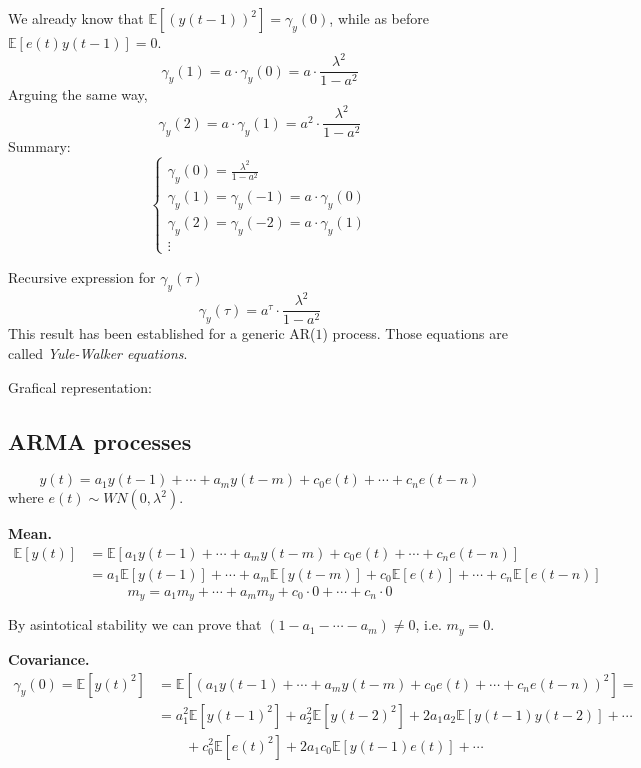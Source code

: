 We already know that $\mathbb{E}\left[(y(t-1))^{2}\right]=\gamma_{y}(0)$, while as before $\mathbb{E}[e(t) y(t-1)]=0$.
$$
\gamma_{y}(1)=a \cdot \gamma_{y}(0)=a \cdot \frac{\lambda^{2}}{1-a^{2}}
$$
Arguing the same way,
\[
	\gamma_{y}(2)=a \cdot \gamma_{y}(1)=a^{2} \cdot \frac{\lambda^{2}}{1-a^{2}}
\]
Summary:
\begin{equation*}
	\begin{cases}
		\gamma_{y}(0)=\frac{\lambda^{2}}{1-a^{2}} \\
		\gamma_{y}(1)=\gamma_{y}(-1)=a \cdot \gamma_{y}(0) \\
		\gamma_{y}(2)=\gamma_{y}(-2)=a \cdot \gamma_{y}(1) \\
		\vdots
	\end{cases}
\end{equation*}

Recursive expression for $\gamma_{y}(\tau)$
$$
	\gamma_{y}(\tau)=a^{\tau} \cdot \frac{\lambda^{2}}{1-a^{2}}
$$
This result has been established for a generic AR($1$) process.
Those equations are called \emph{Yule-Walker equations}.

Grafical representation:



\subsection{ARMA processes}
$$
y(t)=a_{1} y(t-1)+\cdots+a_{m} y(t-m)+c_{0} e(t)+\cdots+c_{n} e(t-n)
$$
where $e(t) \sim W N\left(0, \lambda^{2}\right)$.

\textbf{Mean.}
\begin{align*}
	\mathbb{E}[y(t)] &=\mathbb{E}\left[a_{1} y(t-1)+\cdots+a_{m} y(t-m)+c_{0} e(t)+\cdots+c_{n} e(t-n)\right] \\
	&=a_{1} \mathbb{E}[y(t-1)]+\cdots+a_{m} \mathbb{E}[y(t-m)]+c_{0} \mathbb{E}[e(t)]+\cdots+c_{n} \mathbb{E}[e(t-n)]
\end{align*}
$$
m_{y}=a_{1} m_{y}+\cdots+a_{m} m_{y}+c_{0} \cdot 0+\cdots+c_{n} \cdot 0
$$

By asintotical stability we can prove that $(1-a_1-\cdots-a_m)\neq0$, i.e. $m_{y}=0$.

\textbf{Covariance.}
\begin{align*}
	\gamma_{y}(0) = \mathbb{E}\left[y(t)^{2}\right]&=\mathbb{E}\left[\left(a_{1} y(t-1)+\cdots+a_{m} y(t-m)+c_{0} e(t)+\cdots+c_{n} e(t-n)\right)^{2}\right]=\\
	&= a_{1}^{2} \mathbb{E}\left[y(t-1)^{2}\right]+a_{2}^{2} \mathbb{E}\left[y(t-2)^{2}\right]+2 a_{1} a_{2} \mathbb{E}[y(t-1) y(t-2)]+\cdots \\
	&\qquad+c_{0}^{2} \mathbb{E}\left[e(t)^{2}\right]+2 a_{1} c_{0} \mathbb{E}[y(t-1) e(t)]+\cdots
\end{align*}

